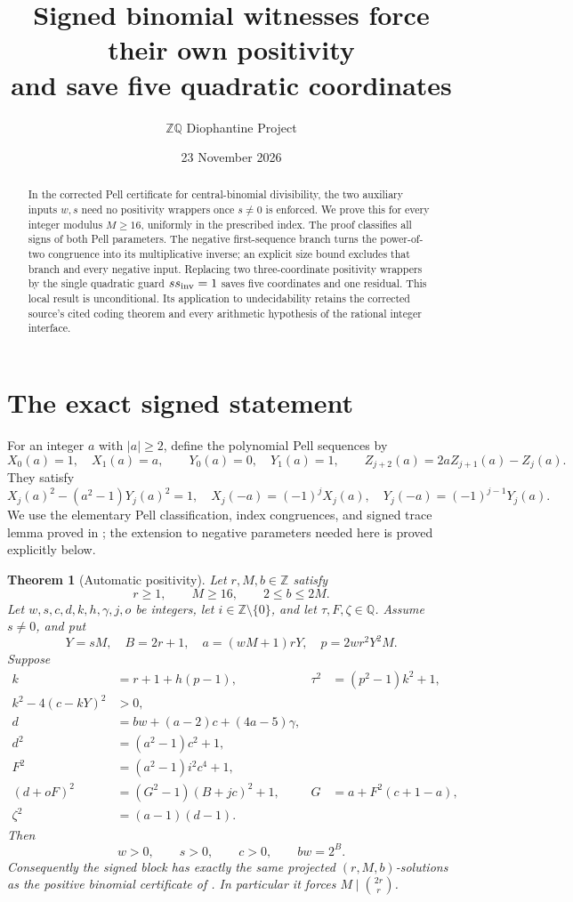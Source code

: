 \documentclass[11pt]{article}
\title{Signed binomial witnesses force their own positivity\\and save five quadratic coordinates}
\author{\(\mathbb Z\mathbb Q\) Diophantine Project}
\date{23 November 2026}
\newtheorem{theorem}{Theorem}
\newcommand{\Z}{\mathbb Z}\newcommand{\Q}{\mathbb Q}
\begin{document}
\maketitle

\begin{abstract}
In the corrected Pell certificate for central-binomial divisibility,
the two auxiliary inputs \(w,s\) need no positivity wrappers once
\(s\ne0\) is enforced. We prove this for every integer modulus
\(M\ge16\), uniformly in the prescribed index. The proof classifies
all signs of both Pell parameters. The negative first-sequence branch
turns the power-of-two congruence into its multiplicative inverse;
an explicit size bound excludes that branch and every negative input.
Replacing two three-coordinate positivity wrappers by the single
quadratic guard \(s s_{\rm inv}=1\) saves five coordinates and one
residual. This local result is unconditional. Its application to
undecidability retains the corrected source's cited coding theorem and
every arithmetic hypothesis of the rational integer interface.
\end{abstract}

\section{The exact signed statement}

For an integer \(a\) with \(|a|\ge2\), define the polynomial Pell
sequences by
\[
 X_0(a)=1,\quad X_1(a)=a,\qquad
 Y_0(a)=0,\quad Y_1(a)=1,\qquad
 Z_{j+2}(a)=2aZ_{j+1}(a)-Z_j(a).
\]
They satisfy
\[
 X_j(a)^2-(a^2-1)Y_j(a)^2=1,
 \quad X_j(-a)=(-1)^jX_j(a),
 \quad Y_j(-a)=(-1)^{j-1}Y_j(a).
\]
We use the elementary Pell classification, index congruences, and
signed trace lemma proved in \cite{Pell}; the extension to negative
parameters needed here is proved explicitly below.

\begin{theorem}[Automatic positivity]\label{main}
Let \(r,M,b\in\Z\) satisfy
\[
 r\ge1,\qquad M\ge16,\qquad 2\le b\le2M.
\]
Let \(w,s,c,d,k,h,\gamma,j,o\) be integers, let
\(i\in\Z\setminus\{0\}\), and let \(\tau,F,\zeta\in\Q\).
Assume \(s\ne0\), and put
\begin{equation}\label{definitions}
 Y=sM,\quad B=2r+1,\quad
 a=(wM+1)rY,\quad p=2wr^2Y^2M.
\end{equation}
Suppose
\begin{align}
 k&=r+1+h(p-1),&\tau^2&=(p^2-1)k^2+1,\label{small}\\
 k^2-4(c-kY)^2&>0,\label{close}\\
 d&=bw+(a-2)c+(4a-5)\gamma,\label{linear}\\
 d^2&=(a^2-1)c^2+1,\label{norm1}\\
 F^2&=(a^2-1)i^2c^4+1,\label{norm2}\\
 (d+oF)^2&=(G^2-1)(B+jc)^2+1,
 &G&=a+F^2(c+1-a),\label{norm3}\\
 \zeta^2&=(a-1)(d-1).\label{root}
\end{align}
Then
\[
 w>0,\qquad s>0,\qquad c>0,\qquad bw=2^B.
\]
Consequently the signed block has exactly the same projected
\((r,M,b)\)-solutions as the positive binomial certificate of
\cite{Binomial}. In particular it forces
\(M\mid\binom{2r}{r}\).
\end{theorem}
\end{document}
